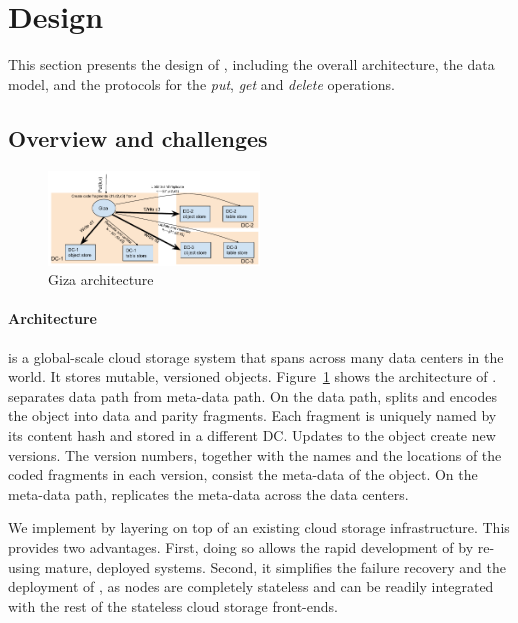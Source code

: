 
\section{Design}

This section presents the design of {\name}, including the overall architecture,
the data model, and the protocols for the {\em put}, {\em get} and {\em delete} operations.

\subsection{Overview and challenges}

\begin{figure}[tp]
\centering
\includegraphics[width=0.5\textwidth]{fig/Giza}
\caption{Giza architecture\label{fig:arch}}
\end{figure}

\paragraph{Architecture}
{\name} is a global-scale cloud storage system 
that spans across many data centers in the world.
It stores mutable, versioned objects.
Figure~\ref{fig:arch} shows the architecture of \name. 
\name separates data path from meta-data path.
On the data path, \name splits and encodes the object into data and parity fragments.
Each fragment is uniquely named by its content hash
and stored in a different DC.
Updates to the object create new versions.
The version numbers, together with the names and the locations of the coded fragments in each version,
consist the meta-data of the object.
On the meta-data path, \name replicates the meta-data across the data centers.

We implement \name by layering on top of an existing cloud storage infrastructure. This 
provides two advantages.  First, doing so allows the rapid development of \name by re-using 
mature, deployed systems.  Second, it simplifies the failure recovery and 
the deployment of \name, as \name nodes are completely stateless and can be
readily integrated with the rest of the stateless cloud storage front-ends.

